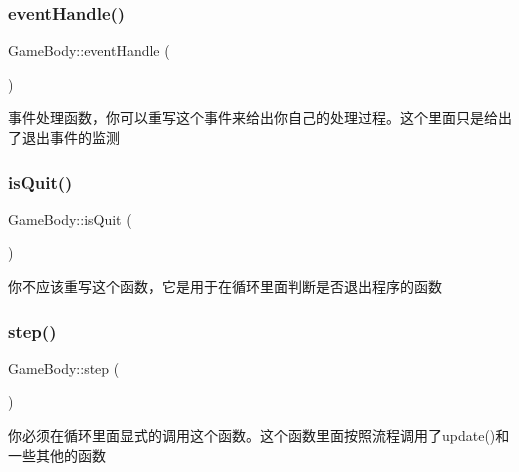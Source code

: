 \subsubsection{\texorpdfstring{eventHandle()}{eventHandle()}}
{\footnotesize\ttfamily Game\+Body\+::event\+Handle (\begin{DoxyParamCaption}{ }\end{DoxyParamCaption})\hspace{0.3cm}{\ttfamily [virtual]}}



事件处理函数，你可以重写这个事件来给出你自己的处理过程。这个里面只是给出了退出事件的监测 

\mbox{\label{class_game_body_a9ec4c012ae72dd25d849d6ebacb9357c}} 
\subsubsection{\texorpdfstring{isQuit()}{isQuit()}}
{\footnotesize\ttfamily Game\+Body\+::is\+Quit (\begin{DoxyParamCaption}{ }\end{DoxyParamCaption})\hspace{0.3cm}{\ttfamily [inline]}}



你不应该重写这个函数，它是用于在循环里面判断是否退出程序的函数 

\mbox{\label{class_game_body_a4eca53ae69ac545e3e3666d7929a9cf4}} 
\subsubsection{\texorpdfstring{step()}{step()}}
{\footnotesize\ttfamily Game\+Body\+::step (\begin{DoxyParamCaption}{ }\end{DoxyParamCaption})\hspace{0.3cm}{\ttfamily [virtual]}}



你必须在循环里面显式的调用这个函数。这个函数里面按照流程调用了update()和一些其他的函数 

\mbox{\label{class_game_body_abeff43d0ab34cf69977c386736953552}} 
